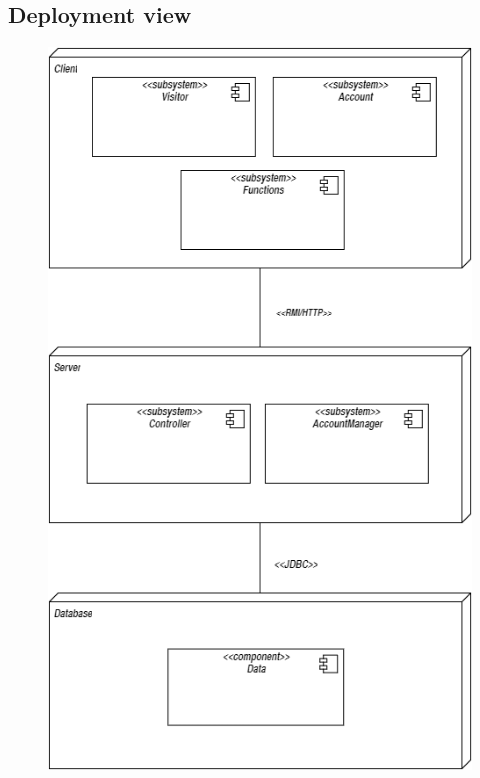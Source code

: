 		\subsection{Deployment view}
		\vspace{0,7cm}
		\begin{figure}[h]
			\centering
			\includegraphics[scale=0.56]{Diagrams/deploymentDiagram.png}
		\end{figure}
	\newpage
